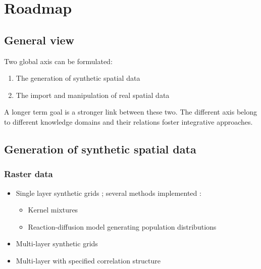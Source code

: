 %





\section{Roadmap}


\subsection{General view}

Two global axis can be formulated:

\begin{enumerate}
	\item The generation of synthetic spatial data
	\item The import and manipulation of real spatial data 
\end{enumerate}

A longer term goal is a stronger link between these two. The different axis belong to different knowledge domains \cite{raimbault2017applied} and their relations foster integrative approaches.



\subsection{Generation of synthetic spatial data}


\subsubsection{Raster data}

\begin{itemize}
	\item Single layer synthetic grids ; several methods implemented :
		\begin{itemize}
			\item Kernel mixtures \cite{anas1998urban}
			\item Reaction-diffusion model generating population distributions \cite{raimbault2018calibration}
		\end{itemize}
	\item Multi-layer synthetic grids
	\item Multi-layer with specified correlation structure
\end{itemize}

